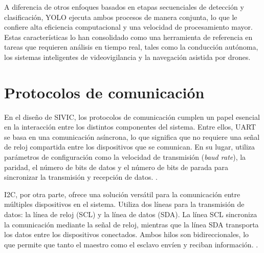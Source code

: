 A diferencia de otros enfoques basados en etapas secuenciales de detección y clasificación, YOLO ejecuta ambos procesos de manera conjunta, lo que le confiere alta eficiencia computacional y una velocidad de procesamiento mayor. Estas características lo han consolidado como una herramienta de referencia en tareas que requieren análisis en tiempo real, tales como la conducción autónoma, los sistemas inteligentes de videovigilancia y la navegación asistida por drones.

\section{Protocolos de comunicación}

En el diseño de SIVIC, los protocolos de comunicación cumplen un papel esencial en la interacción entre los distintos componentes del sistema. Entre ellos, UART se basa en una comunicación asíncrona, lo que significa que no requiere una señal de reloj compartida entre los dispositivos que se comunican. En su lugar, utiliza parámetros de configuración como la velocidad de transmisión (\textit{baud rate}), la paridad, el número de bits de datos y el número de bits de parada para sincronizar la transmisión y recepción de datos. \citep{WEBSITE:uart}.

I2C, por otra parte, ofrece una solución versátil para la comunicación entre múltiples dispositivos en el sistema. Utiliza dos líneas para la transmisión de datos: la línea de reloj (SCL) y la línea de datos (SDA). La línea SCL sincroniza la comunicación mediante la señal de reloj, mientras que la línea SDA transporta los datos entre los dispositivos conectados. Ambos hilos son bidireccionales, lo que permite que tanto el maestro como el esclavo envíen y reciban información. \citep{WEBSITE:i2c}.
